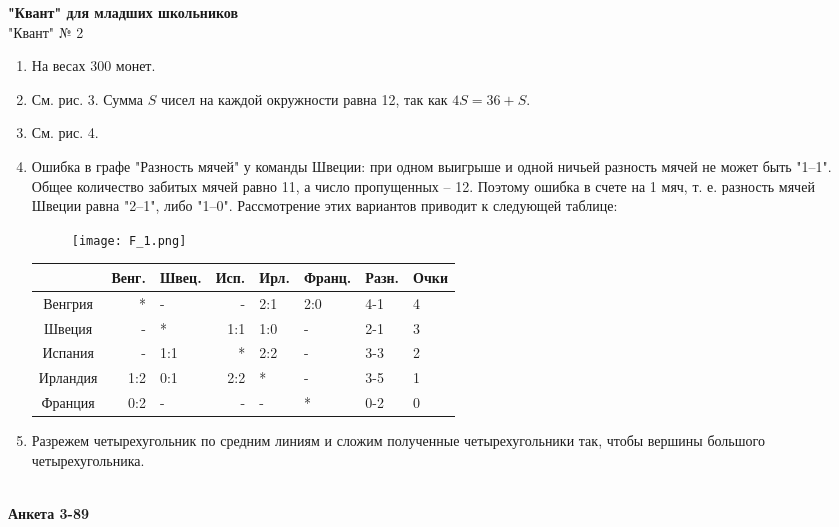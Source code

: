\documentclass[twocolumn,4pt]{article}
\begin{document}
\textbf{"Квант" для младших школьников} \\
"Квант" № 2 
\begin{enumerate}
    \item На весах 300 монет.
    \item См. рис. 3. Сумма $S$ чисел на каждой окружности равна 12, так как $4S=36+S$.
    \item См. рис. 4.
    \item Ошибка в графе "Разность мячей" у команды Швеции: при одном выигрыше и одной ничьей разность мячей не может быть "1--1". Общее количество забитых мячей равно 11, а число пропущенных -- 12. Поэтому ошибка в счете на 1 мяч, т. е. разность мячей Швеции равна "2--1", либо "1--0". Рассмотрение этих вариантов приводит к следующей таблице:
    

  \begin{figure}
\centering
\texttt{[image: F\_1.png]}
\label{fig:frog}
\end{figure}

\begin{table}[h!]
\centering
\begin{tabular}{|c|r|l|d|g|f|e|w|}
\hline
& Венг. & Швец. & Исп. & Ирл. & Франц. & Разн.&Очки  \\
\hline
Венгрия&*&-&-&2:1&2:0&4-1&4  \\
Швеция&-&*&1:1&1:0&-&2-1&3 \\
Испания&-&1:1&*&2:2&-&3-3&2 \\
Ирландия&1:2&0:1&2:2&*&-&3-5&1 \\
Франция&0:2&-&-&-&*&0-2&0 \\
\hline
\end{tabular}
\end{table}

\item Разрежем четырехугольник по средним линиям и сложим полученные четырехугольники так, чтобы вершины большого четырехугольника.
\end{enumerate} \\ 

{\fontsize{32}{38}\selectfont \textbf{Анкета 3-89}}  \\
\end{document}
